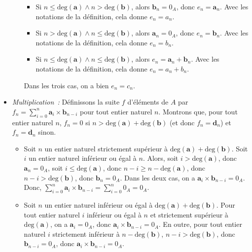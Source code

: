 \begin{itemize}[nosep]
\begin{itemize}[nosep]
\begin{itemize}[nosep]
                    \item Si $n \leq \mathrm{deg}(\mathbf{a}) \wedge n > \mathrm{deg}(\mathbf{b})$, alors $\mathbf{b}_n = 0_A$, donc $e_n = \mathbf{a}_n$. 
                        Avec les notations de la définition, cela donne $e_n = a_n$.
                    \item Si $n > \mathrm{deg}(\mathbf{a}) \wedge n \leq \mathrm{deg}(\mathbf{b})$, alors $\mathbf{a}_n = 0_A$, donc $e_n = \mathbf{b}_n$. 
                        Avec les notations de la définition, cela donne $e_n = b_n$.
                    \item Si $n \leq \mathrm{deg}(\mathbf{a}) \wedge n \leq \mathrm{deg}(\mathbf{b})$, alors $e_n = \mathbf{a}_n + \mathbf{b}_n$. 
                        Avec les notations de la définition, cela donne $e_n = a_n + b_n$.
                \end{itemize}
                Dans les trois cas, on a bien $e_n = c_n$.
        \end{itemize}
    \item \textit{Multiplication :} 
        Définissons la suite $f$ d'éléments de $A$ par $f_n = \sum_{i=0}^n \mathbf{a}_i \times \mathbf{b}_{n-i}$ pour tout entier naturel $n$.
        Montrons que, pour tout entier naturel $n$, $f_n = 0$ si $n > \mathrm{deg}(\mathbf{a}) + \mathrm{deg}(\mathbf{b})$ (et donc $f_n = \mathbf{d}_n$) et $f_n = \mathbf{d}_n$ sinon.
        \begin{itemize}[nosep]
            \item Soit $n$ un entier naturel strictement supérieur à $\mathrm{deg}(\mathbf{a}) + \mathrm{deg}(\mathbf{b})$.
                Soit $i$ un entier naturel inférieur ou égal à $n$. 
                Alors, soit $i > \mathrm{deg}(\mathbf{a})$, donc $\mathbf{a}_n = 0_A$, soit $i \leq \mathrm{deg}(\mathbf{a})$, donc $n - i \geq n - \mathrm{deg}(\mathbf{a})$, donc $n - i > \mathrm{deg}(\mathbf{b})$, donc $\mathbf{b}_n = 0_A$.
                Dans les deux cas, on a $\mathbf{a}_i \times \mathbf{b}_{n-i} = 0_A$.
                Donc, $\sum_{i=0}^n \mathbf{a}_i \times \mathbf{b}_{n-i} = \sum_{i=0}^n 0_A = 0_A$.
            \item Soit $n$ un entier naturel inférieur ou égal à $\mathrm{deg}(\mathbf{a}) + \mathrm{deg}(\mathbf{b})$.
                Pour tout entier naturel $i$ inférieur ou égal à $n$ et strictement supérieur à $\mathrm{deg}(\mathbf{a})$, on a $\mathbf{a}_i = 0_A$, donc $\mathbf{a}_i \times \mathbf{b}_{n-i} = 0_A$.
                En outre, pour tout entier naturel $i$ strictement inférieur à $n - \mathrm{deg}(\mathbf{b})$, $n - i > \mathrm{deg}(\mathbf{b})$, donc $\mathbf{b}_{n-i} = 0_A$, donc $\mathbf{a}_i \times \mathbf{b}_{n-i} = 0_A$.

\end{itemize}
\end{itemize}

